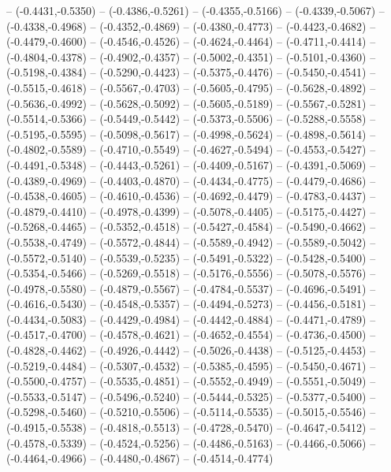 {	-- (-0.4431,-0.5350)
	-- (-0.4386,-0.5261)
	-- (-0.4355,-0.5166)
	-- (-0.4339,-0.5067)
	-- (-0.4338,-0.4968)
	-- (-0.4352,-0.4869)
	-- (-0.4380,-0.4773)
	-- (-0.4423,-0.4682)
	-- (-0.4479,-0.4600)
	-- (-0.4546,-0.4526)
	-- (-0.4624,-0.4464)
	-- (-0.4711,-0.4414)
	-- (-0.4804,-0.4378)
	-- (-0.4902,-0.4357)
	-- (-0.5002,-0.4351)
	-- (-0.5101,-0.4360)
	-- (-0.5198,-0.4384)
	-- (-0.5290,-0.4423)
	-- (-0.5375,-0.4476)
	-- (-0.5450,-0.4541)
	-- (-0.5515,-0.4618)
	-- (-0.5567,-0.4703)
	-- (-0.5605,-0.4795)
	-- (-0.5628,-0.4892)
	-- (-0.5636,-0.4992)
	-- (-0.5628,-0.5092)
	-- (-0.5605,-0.5189)
	-- (-0.5567,-0.5281)
	-- (-0.5514,-0.5366)
	-- (-0.5449,-0.5442)
	-- (-0.5373,-0.5506)
	-- (-0.5288,-0.5558)
	-- (-0.5195,-0.5595)
	-- (-0.5098,-0.5617)
	-- (-0.4998,-0.5624)
	-- (-0.4898,-0.5614)
	-- (-0.4802,-0.5589)
	-- (-0.4710,-0.5549)
	-- (-0.4627,-0.5494)
	-- (-0.4553,-0.5427)
	-- (-0.4491,-0.5348)
	-- (-0.4443,-0.5261)
	-- (-0.4409,-0.5167)
	-- (-0.4391,-0.5069)
	-- (-0.4389,-0.4969)
	-- (-0.4403,-0.4870)
	-- (-0.4434,-0.4775)
	-- (-0.4479,-0.4686)
	-- (-0.4538,-0.4605)
	-- (-0.4610,-0.4536)
	-- (-0.4692,-0.4479)
	-- (-0.4783,-0.4437)
	-- (-0.4879,-0.4410)
	-- (-0.4978,-0.4399)
	-- (-0.5078,-0.4405)
	-- (-0.5175,-0.4427)
	-- (-0.5268,-0.4465)
	-- (-0.5352,-0.4518)
	-- (-0.5427,-0.4584)
	-- (-0.5490,-0.4662)
	-- (-0.5538,-0.4749)
	-- (-0.5572,-0.4844)
	-- (-0.5589,-0.4942)
	-- (-0.5589,-0.5042)
	-- (-0.5572,-0.5140)
	-- (-0.5539,-0.5235)
	-- (-0.5491,-0.5322)
	-- (-0.5428,-0.5400)
	-- (-0.5354,-0.5466)
	-- (-0.5269,-0.5518)
	-- (-0.5176,-0.5556)
	-- (-0.5078,-0.5576)
	-- (-0.4978,-0.5580)
	-- (-0.4879,-0.5567)
	-- (-0.4784,-0.5537)
	-- (-0.4696,-0.5491)
	-- (-0.4616,-0.5430)
	-- (-0.4548,-0.5357)
	-- (-0.4494,-0.5273)
	-- (-0.4456,-0.5181)
	-- (-0.4434,-0.5083)
	-- (-0.4429,-0.4984)
	-- (-0.4442,-0.4884)
	-- (-0.4471,-0.4789)
	-- (-0.4517,-0.4700)
	-- (-0.4578,-0.4621)
	-- (-0.4652,-0.4554)
	-- (-0.4736,-0.4500)
	-- (-0.4828,-0.4462)
	-- (-0.4926,-0.4442)
	-- (-0.5026,-0.4438)
	-- (-0.5125,-0.4453)
	-- (-0.5219,-0.4484)
	-- (-0.5307,-0.4532)
	-- (-0.5385,-0.4595)
	-- (-0.5450,-0.4671)
	-- (-0.5500,-0.4757)
	-- (-0.5535,-0.4851)
	-- (-0.5552,-0.4949)
	-- (-0.5551,-0.5049)
	-- (-0.5533,-0.5147)
	-- (-0.5496,-0.5240)
	-- (-0.5444,-0.5325)
	-- (-0.5377,-0.5400)
	-- (-0.5298,-0.5460)
	-- (-0.5210,-0.5506)
	-- (-0.5114,-0.5535)
	-- (-0.5015,-0.5546)
	-- (-0.4915,-0.5538)
	-- (-0.4818,-0.5513)
	-- (-0.4728,-0.5470)
	-- (-0.4647,-0.5412)
	-- (-0.4578,-0.5339)
	-- (-0.4524,-0.5256)
	-- (-0.4486,-0.5163)
	-- (-0.4466,-0.5066)
	-- (-0.4464,-0.4966)
	-- (-0.4480,-0.4867)
	-- (-0.4514,-0.4774)
}
